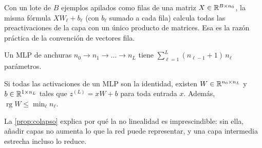 \addtocounter{figure}{1}%

Con un lote de $B$ ejemplos apilados como filas de una matriz $X\in\mathbb{R}^{B\times n_0}$, la misma fórmula $XW_\ell+b_\ell$ (con $b_\ell$ sumado a cada fila) calcula todas las preactivaciones de la capa con un único producto de matrices. Esa es la razón práctica de la convención de vectores fila.

\begin{proposicion}\label{prop:parametros-mlp}
Un MLP de anchuras $n_0\to n_1\to\dots\to n_L$ tiene $\sum_{\ell=1}^{L}(n_{\ell-1}+1)\,n_\ell$ parámetros.
\end{proposicion}

\addtocounter{definicion}{1}%

\begin{proposicion}\label{prop:colapso}
Si todas las activaciones de un MLP son la identidad, existen $W\in\mathbb{R}^{n_0\times n_L}$ y $b\in\mathbb{R}^{1\times n_L}$ tales que $z^{(L)}=xW+b$ para toda entrada $x$. Además, $\operatorname{rg}W\le\min_{\ell}n_\ell$.
\end{proposicion}

La \cref{prop:colapso} explica por qué la no linealidad es imprescindible: sin ella, añadir capas no aumenta lo que la red puede representar, y una capa intermedia estrecha incluso lo reduce.

\addtocounter{definicion}{1}%

